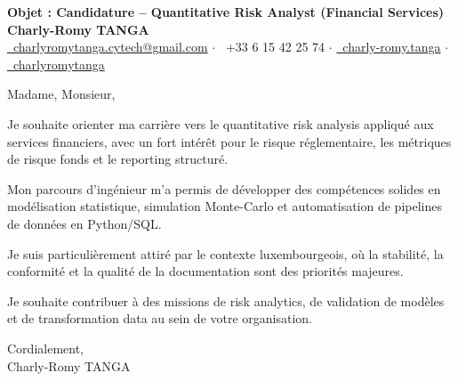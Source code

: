\documentclass[10pt, letterpaper]{article}
\begin{document}
\begin{center}
\textbf{\LARGE Objet : Candidature -- Quantitative Risk Analyst (Financial Services)}\\[0.2cm]
\textbf{\large Charly-Romy TANGA}\\[0.2cm]
\href{mailto:charlyromytanga.cytech@gmail.com}{\faEnvelope\ charlyromytanga.cytech@gmail.com} \quad$\cdot$\quad
\faPhone\ +33 6 15 42 25 74 \quad$\cdot$\quad
\href{https://www.linkedin.com/in/charly-romy-tanga}{\faLinkedin\ charly-romy.tanga} \quad$\cdot$\quad
\href{https://github.com/charlyromytanga}{\faGithub\ charlyromytanga}
\end{center}
Madame, Monsieur,

Je souhaite orienter ma carrière vers le quantitative risk analysis appliqué aux services financiers, avec un fort intérêt pour le risque réglementaire, les métriques de risque fonds et le reporting structuré.

Mon parcours d'ingénieur m'a permis de développer des compétences solides en modélisation statistique, simulation Monte-Carlo et automatisation de pipelines de données en Python/SQL.

Je suis particulièrement attiré par le contexte luxembourgeois, où la stabilité, la conformité et la qualité de la documentation sont des priorités majeures.

Je souhaite contribuer à des missions de risk analytics, de validation de modèles et de transformation data au sein de votre organisation.

Cordialement,\\
Charly-Romy TANGA
\end{document}
